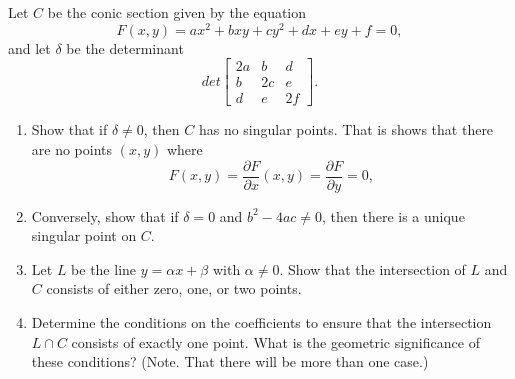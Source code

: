 \newpage
\begin{tcolorbox}[title=Problem 2, breakable]
    Let $C$ be the conic section given by the equation 
    \[F(x, y) = ax^2 + bxy + cy^2 + dx + ey + f = 0,\]
    and let $\delta$ be the determinant 
    \[det \begin{bmatrix}
        2a & b & d \\
        b & 2c & e \\
        d & e & 2f
    \end{bmatrix}.\]
    \begin{enumerate}
        \item Show that if $\delta \ne 0$, then $C$ has no singular points. That is shows that there 
        are no points $(x, y)$ where 
        \[F(x, y) = \frac{\partial F}{\partial x}(x, y) = \frac{\partial F}{\partial y} = 0,\]
        \item Conversely, show that if $\delta = 0$ and $b^2 - 4ac \ne 0$, then there is a unique singular point on $C$.
        \item Let $L$ be the line $y = \alpha x + \beta$ with $\alpha \ne 0$. Show that the intersection 
        of $L$ and $C$ consists of either zero, one, or two points.
        \item Determine the conditions on the coefficients to ensure that the intersection $L \cap C$
        consists of exactly one point. What is the geometric significance of these conditions?
        (Note. That there will be more than one case.)
    \end{enumerate}
\end{tcolorbox}

